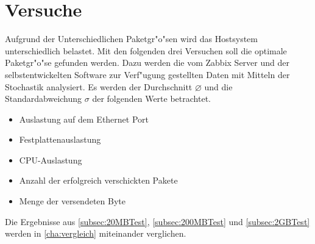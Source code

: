\chapter{Versuche}
\label{cha:versuche}
Aufgrund der Unterschiedlichen Paketgr"o"sen wird das Hostsystem unterschiedlich belastet. Mit den %
folgenden drei Versuchen soll die optimale Paketgr"o"se gefunden werden. %
Dazu werden die vom Zabbix Server und der selbstentwickelten Software zur Verf"ugung gestellten %
Daten mit Mitteln der Stochastik analysiert. Es werden der Durchschnitt $\diameter $ und die Standardabweichung $\sigma $
der folgenden Werte betrachtet. %
\begin{itemize}
\item Auslastung auf dem Ethernet Port
\item Festplattenauslastung
\item CPU-Auslastung 
\item Anzahl der erfolgreich verschickten Pakete
\item Menge der versendeten Byte
\end{itemize}

Die Ergebnisse aus \cref{subsec:20MBTest}, \cref{subsec:200MBTest} und \cref{subsec:2GBTest} werden %
in \cref{cha:vergleich} miteinander verglichen. %





